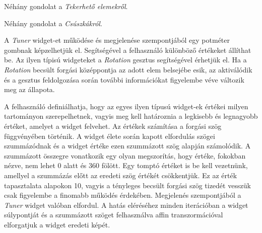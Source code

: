 
Néhány gondolat a \textit{Tekerhető elemekről}.


Néhány gondolat a \textit{Csúszkákról}.


A \textit{Tuner} widget-et működése és megjelenése szempontjából egy potméter gombnak képzelhetjük el. Segítségével a felhasználó különböző értékeket állíthat be.
Az ilyen típisú widgeteket a \textit{Rotation} gesztus segítségével érhetjük el. Ha a \textit{Rotation} becsült forgási középpontja az adott elem belsejébe esik, az aktiválódik és a gesztus feldolgozása során további információkat figyelembe véve változik meg az állapota.

A felhasználó definiálhatja, hogy az egyes ilyen típusú widget-ek értékei milyen tartományon szerepelhetnek, vagyis meg kell határoznia a legkisebb és legnagyobb értéket, amelyet a widget felvehet. Az értékek számítása a forgási szög függvényében történik. A widget élete során kapott elfordulás szögei szummázódnak és a widget értéke ezen szummázott szög alapján számolódik. A szummázott összegre vonatkozik egy olyan megszorítás, hogy értéke, fokokban nézve, nem lehet 0 alatt és 360 fölött. Egy tomptó értéket is be kell vezetnünk, amellyel a szummázás előtt az eredeti szög értékét csökkentjük. Ez az érték tapasztalata alapokon 10, vagyis a tényleges becsült forgási szög tizedét vesszük csak figyelembe a finomabb működés érdekében.
Megjelenés szempontjából a \textit{Tuner} widget valóban elfordul. A hatás eléréséhez minden iterációban a widget súlypontját és a szummázott szöget felhasználva affin transzormációval elforgatjuk a widget eredeti képét.
